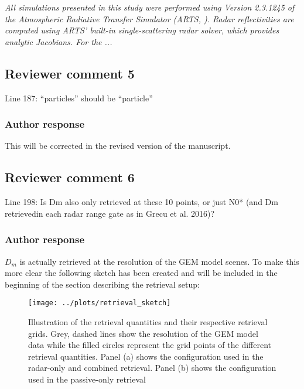 \documentclass[11pt]{scrartcl}
\begin{document}
\begin{itemize}
\textit{
All simulations presented in this study were performed using Version 2.3.1245 of
the Atmospheric Radiative Transfer Simulator (ARTS, \cite{arts18}). Radar
reflectivities are computed using ARTS' built-in single-scattering radar solver,
which provides analytic Jacobians. For the ...
}

\subsection*{Reviewer comment 5}
Line 187: “particles” should be “particle”

\subsubsection*{Author response}

This will be corrected in the revised version of the manuscript.


\subsection{Reviewer comment 6}
Line 198: Is Dm also only retrieved at these 10 points, or just N0* (and Dm retrievedin each radar range gate as in Grecu et al. 2016)?

\subsubsection*{Author response}

$D_m$ is actually retrieved at the resolution of the GEM model scenes. To make this more clear
the following sketch has been created and will be included in the beginning of the section
describing the retrieval setup:

\begin{figure}
\centering
\texttt{[image: ../plots/retrieval\_sketch]}
\caption{Illustration of the retrieval quantities and their respective retrieval
  grids. Grey, dashed lines show the resolution of the GEM model data while the
  filled circles represent the grid points of the different retrieval
  quantities. Panel (a) shows the configuration used in the radar-only and
  combined retrieval. Panel (b) shows the configuration used in the passive-only
  retrieval}
\label{fig:retrieval_sketch}
\end{figure}




\end{itemize}
\end{document}

